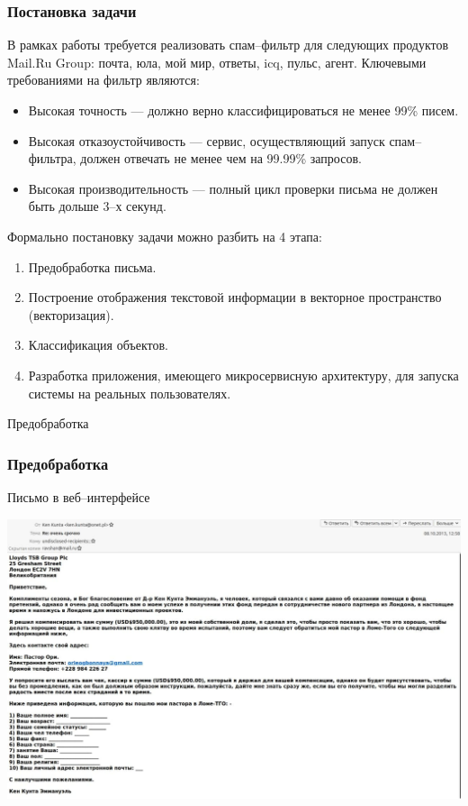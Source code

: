 \documentclass[compress,professionalfont]{beamer}
\begin{document}
\begin{frame}
\frametitle{Постановка задачи}

В рамках работы требуется реализовать спам--фильтр для следующих продуктов Mail.Ru Group: почта, юла, мой мир, ответы, icq, пульс, агент. Ключевыми требованиями на фильтр являются:
\begin{itemize}
\item Высокая точность --- должно верно классифицироваться не менее 99\% писем.
\item Высокая отказоустойчивость --- сервис, осуществляющий запуск спам--фильтра, должен отвечать не менее чем на 99.99\% запросов.
\item Высокая производительность --- полный цикл проверки письма не должен быть дольше 3--х секунд.
\end{itemize}

Формально постановку задачи можно разбить на 4 этапа:
\begin{enumerate}
\item Предобработка письма.
\item Построение отображения текстовой информации в векторное пространство (векторизация).
\item Классификация объектов.
\item Разработка приложения, имеющего микросервисную архитектуру, для запуска системы на реальных пользователях.
\end{enumerate}

\end{frame}

\begin{frame}

\begin{center}
Предобработка
\end{center}

\end{frame}

\begin{frame}
\frametitle{Предобработка}

Письмо в веб--интерфейсе
\begin{center}
\includegraphics[width=.9\textwidth]{eml.jpg}
\end{center}

\end{frame}
\end{document}

